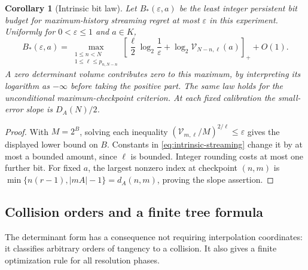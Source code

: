 \documentclass[11pt]{amsart}
\newtheorem{corollary}[theorem]{Corollary}
\theoremstyle{definition}\newtheorem{definition}[theorem]{Definition}
\theoremstyle{remark}\newtheorem{remark}[theorem]{Remark}
\begin{document}
\begin{corollary}[Intrinsic bit law]\label{cor:intrinsic-bits}
Let $B_*(\varepsilon,a)$ be the least integer persistent bit budget
for maximum-history streaming regret at most $\varepsilon$ in this
experiment. Uniformly for $0<\varepsilon\le1$ and $a\in K$,
\begin{equation}\label{eq:intrinsic-bits}
 B_*(\varepsilon,a)=
 \max_{\substack{1\le n<N\\1\le\ell\le p_{n,N-n}}}
 \left[\frac{\ell}{2}\log_2\frac1\varepsilon+
       \log_2\mathcal V_{N-n,\ell}(a)\right]_++O(1).
\end{equation}
A zero determinant volume contributes zero to this maximum, by interpreting
its logarithm as $-\infty$ before taking the positive part. The same law
holds for the unconditional maximum-checkpoint criterion. At each fixed
calibration the small-error slope is $D_A(N)/2$.
\end{corollary}
\begin{proof}
With $M=2^B$, solving each inequality
$(\mathcal V_{m,\ell}/M)^{2/\ell}\le\varepsilon$ gives the displayed
lower bound on $B$. Constants in \eqref{eq:intrinsic-streaming} change
it by at most a bounded amount, since $\ell$ is bounded. Integer rounding
costs at most one further bit. For fixed $a$, the largest nonzero index
at checkpoint $(n,m)$ is
$\min\{n(r-1),|mA|-1\}=d_A(n,m)$, proving the slope assertion.
\end{proof}

\subsection{Collision orders and a finite tree formula}
The determinant form has a consequence not requiring interpolation
coordinates: it classifies arbitrary orders of tangency to a collision.
It also gives a finite optimization rule for all resolution phases.
\end{document}
